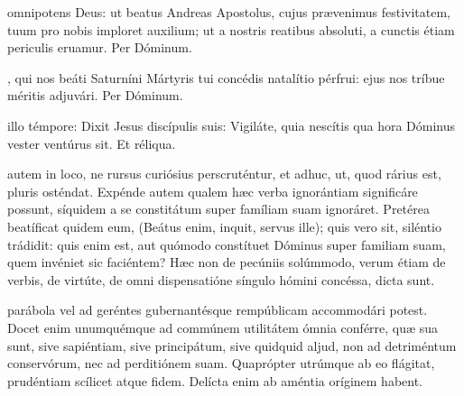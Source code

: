 \documentclass[fontsize=9pt,paper=A6,twoside,BCOR=1mm,DIV=22,headinclude]{scrarticle}
\begin{document}
\begin{multicols}{2}
\Te



 omnipotens Deus: ut beatus Andreas Apostolus, cujus prævenimus festivitatem, tuum pro nobis imploret auxilium; ut a nostris reatibus absoluti, a cunctis étiam periculis eruamur. Per Dóminum.


\AiiM 

\VRMii 

, qui nos beáti Saturníni Mártyris tui concédis natalítio pérfrui: ejus nos tríbue méritis adjuvári. Per Dóminum.







 illo témpore: Dixit Jesus discípulis suis: Vigiláte, quia nescítis qua hora Dóminus vester ventúrus sit. Et réliqua.

 autem in loco, ne rursus curiósius perscruténtur, et adhuc, ut, quod rárius est, pluris osténdat.
Expénde autem qualem hæc verba ignorántiam significáre possunt, síquidem a se constitátum super famíliam suam ignoráret. Pretérea beatíficat quidem eum, (Beátus enim, inquit, servus ille); quis vero sit, siléntio trádidit: quis enim est, aut quómodo constítuet Dóminus super familiam suam, quem invéniet sic faciéntem? Hæc non de pecúniis solúmmodo, verum étiam de verbis, de virtúte, de omni dispensatióne síngulo hómini concéssa, dicta sunt.


\RVCPvii

 parábola vel ad geréntes gubernantésque rempúblicam accommodári potest. Docet enim unumquémque ad commúnem utilitátem ómnia conférre, quæ sua sunt, sive sapiéntiam, sive principátum, sive quidquid aljud, non ad detriméntum conservórum, nec ad perditiónem suam. Quaprópter utrúmque ab eo flágitat, prudéntiam scílicet
atque fidem. Delícta enim ab améntia oríginem habent.


\end{multicols}
\end{document}
